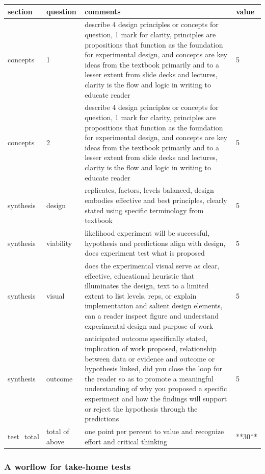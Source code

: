 \documentclass[
]{book}
\begin{document}
\begin{tabular}{l|l|l|l}
\hline
section & question & comments & value\\
\hline
concepts & 1 & describe 4 design principles or concepts for question, 1 mark for clarity, principles are propositions that function as the foundation for experimental design, and concepts are key ideas from the textbook primarily and to a lesser extent from slide decks and lectures, clarity is the flow and logic in writing to educate reader & 5\\
\hline
concepts & 2 & describe 4 design principles or concepts for question, 1 mark for clarity, principles are propositions that function as the foundation for experimental design, and concepts are key ideas from the textbook primarily and to a lesser extent from slide decks and lectures, clarity is the flow and logic in writing to educate reader & 5\\
\hline
synthesis & design & replicates, factors, levels balanced, design embodies effective and best principles, clearly stated using specific terminology from textbook & 5\\
\hline
synthesis & viability & likelihood experiment will be successful, hypothesis and predictions align with design, does experiment test what is proposed & 5\\
\hline
synthesis & visual & does the experimental visual serve as clear, effective, educational heuristic that illuminates the design, text to a limited extent to list levels, reps, or explain implementation and salient design elements, can a reader inspect figure and understand experimental design and purpose of work & 5\\
\hline
synthesis & outcome & anticipated outcome specifically stated, implication of work proposed, relationship between data or evidence and outcome or hypothesis linked, did you close the loop for the reader so as to promote a meaningful understanding of why you proposed a specific experiment and how the findings will support or reject the hypothesis through the predictions & 5\\
\hline
test\_total & total of above & one point per percent to value and recognize effort and critical thinking & **30**\\
\hline
\end{tabular}

\hypertarget{a-worflow-for-take-home-tests}{%
\subsubsection*{A worflow for take-home tests}\label{a-worflow-for-take-home-tests}}
\end{document}

